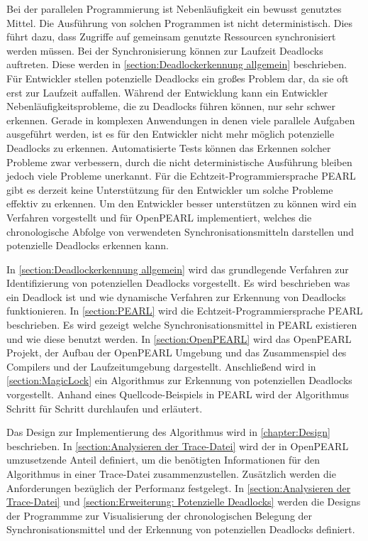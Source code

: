 Bei der parallelen Programmierung ist Nebenläufigkeit ein bewusst genutztes
Mittel. Die Ausführung von solchen Programmen ist nicht deterministisch. Dies
führt dazu, dass Zugriffe auf gemeinsam genutzte Ressourcen synchronisiert
werden müssen. Bei der Synchronisierung können zur Laufzeit Deadlocks auftreten.
Diese werden in \cref{section:Deadlockerkennung allgemein} beschrieben. Für
Entwickler stellen potenzielle Deadlocks ein großes Problem dar, da sie oft erst
zur Laufzeit auffallen. Während der Entwicklung kann ein Entwickler
Nebenläufigkeitsprobleme, die zu Deadlocks führen können, nur sehr schwer
erkennen. Gerade in komplexen Anwendungen in denen viele parallele Aufgaben
ausgeführt werden, ist es für den Entwickler nicht mehr möglich potenzielle
Deadlocks zu erkennen. Automatisierte Tests können das Erkennen solcher Probleme
zwar verbessern, durch die nicht deterministische Ausführung bleiben jedoch
viele Probleme unerkannt. Für die Echtzeit-Programmiersprache
PEARL\autocite{PEARL} gibt es derzeit keine Unterstützung für den Entwickler um
solche Probleme effektiv zu erkennen. Um den Entwickler besser unterstützen zu
können wird ein Verfahren vorgestellt und für OpenPEARL\autocite{OpenPEARL}
implementiert, welches die chronologische Abfolge von verwendeten
Synchronisationsmitteln darstellen und potenzielle Deadlocks erkennen kann. 

In \cref{section:Deadlockerkennung allgemein} wird das grundlegende Verfahren
zur Identifizierung von potenziellen Deadlocks vorgestellt. Es wird beschrieben
was ein Deadlock ist und wie dynamische Verfahren zur Erkennung von Deadlocks
funktionieren. In \cref{section:PEARL} wird die Echtzeit-Programmiersprache
PEARL beschrieben. Es wird gezeigt welche Synchronisationsmittel in PEARL
existieren und wie diese benutzt werden. In \cref{section:OpenPEARL} wird das
OpenPEARL Projekt, der Aufbau der OpenPEARL Umgebung und das Zusammenspiel des
Compilers und der Laufzeitumgebung dargestellt. Anschließend wird in
\cref{section:MagicLock} ein Algorithmus zur Erkennung von potenziellen
Deadlocks vorgestellt. Anhand eines Quellcode-Beispiels in PEARL wird der
Algorithmus Schritt für Schritt durchlaufen und erläutert. 

Das Design zur Implementierung des Algorithmus wird in \cref{chapter:Design}
beschrieben. In \cref{section:Analysieren der Trace-Datei} wird der in OpenPEARL
umzusetzende Anteil definiert, um die benötigten Informationen für den
Algorithmus in einer Trace-Datei zusammenzustellen. Zusätzlich werden die
Anforderungen bezüglich der Performanz festgelegt. In \cref{section:Analysieren
der Trace-Datei} und \cref{section:Erweiterung: Potenzielle Deadlocks} werden
die Designs der Programmme zur Visualisierung der chronologischen Belegung der
Synchronisationsmittel und der Erkennung von potenziellen Deadlocks definiert.

